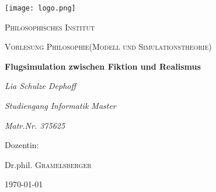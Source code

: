 \documentclass[12pt]{article}
\begin{document}
%
%
\begin{titlepage}
	\centering
	\texttt{[image: logo.png]}\par\vspace{1cm}
	{\scshape\LARGE Philosophisches Institut \par}
	\vspace{1cm}
	{\scshape\Large Vorlesung Philosophie\newline(Modell und Simulationstheorie)\par}
	\vspace{1.5cm}
	{\huge\bfseries Flugsimulation zwischen Fiktion und Realismus\par}
	\vspace{2cm}
	{\Large\itshape Lia Schulze Dephoff\par}
	{\itshape Studiengang Informatik Master\par}
	{\itshape Matr.Nr. 375625\par}
	\vfill
	Dozentin:\par
	Dr.phil. \textsc{Gramelsberger}

	\vfill

	{\large \today\par}
\end{titlepage}

%
%
\newpage
\tableofcontents 
\newpage
%
%
\end{document}
